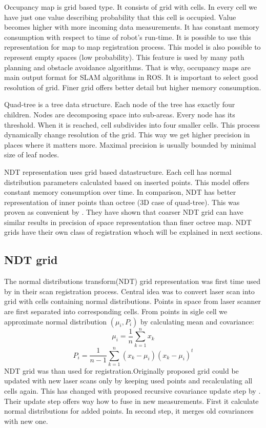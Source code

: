 Occupancy map is grid based type. It consists of grid with cells. In every cell we have just one value describing probability that this cell is occupied. Value becomes higher with more incoming data measurements. It has constant memory consumption with respect to time of robot's run-time. It is possible to use this representation for map to map registration process. This model is also possible to represent empty spaces (low probability). This feature is used by many path planning and obstacle avoidance algorithms. That is why, occupancy maps are main output format for SLAM algorithms in ROS. It is important to select good resolution of grid. Finer grid offers better detail but higher memory consumption.

Quad-tree is a tree data structure. Each node of the tree has exactly four children. Nodes are decomposing space into sub-areas. Every node has its threshold. When it is reached, cell subdivides into four smaller cells. This process dynamically change resolution of the grid. This way we get higher precision in places where it matters more. Maximal precision is usually bounded by minimal size of leaf nodes.

\gls{NDT} representation uses grid based datastructure. Each cell has normal distribution parameters calculated based on inserted points. This model offers constant memory consumption over time. In comparison, \gls{NDT} has better representation of inner points than octree (3D case of quad-tree). This was proven as convenient by \cite{Saarinen13}. They have shown that coarser \gls{NDT} grid can have similar results in precision of space representation than finer octree map. \gls{NDT} grids have their own class of registration whoch will be explained in next sections.     
\newpage


\subsection{NDT grid}
\label{subsec:NDT_grid}
The normal distributions transform(NDT) grid representation was first time used by \cite{Biber03} in their scan registration process. Central idea was to convert laser scan into grid with cells containing normal distributions. Points in space from laser scanner are first separated into corresponding cells. From points in sigle cell we approximate normal distribution $(\mu_{i},P_{i})$ by calculating mean and covariance:
\begin{equation}
\mu_{i} = \dfrac{1}{n}\sum_{k=1}^{n}x_{k}
\end{equation}  
\begin{equation}
P_{i} = \dfrac{1}{n-1}\sum_{k=1}^{n}(x_{k}-\mu_{i})(x_{k}-\mu_{i})^{t}
\end{equation} 
NDT grid was than used for registration.Originally proposed grid could be updated with new laser scans only by keeping used points and recalculating all cells again. This has changed with proposed recursive covariance update step by \cite{Saarinen13}. Their update step offers way how to fuse in new measurements. First it calculate normal distributions for added points. In second step, it merges old covariances with new one.

